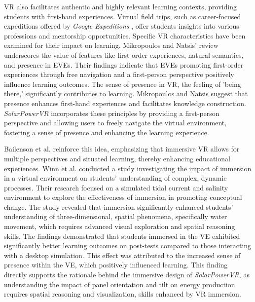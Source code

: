 \documentclass[draft, final]{vutinfth} %
\begin{document}
VR also facilitates authentic and highly relevant learning contexts, providing students with first-hand experiences. Virtual field trips, such as career-focused expeditions offered by \textit{Google Expeditions} \cite{Sung2015Effects}, offer students insights into various professions and mentorship opportunities. Specific VR characteristics have been examined for their impact on learning. Mikropoulos and Natsis' review \cite{Mikropoulos2011VrEducational} underscores the value of features like first-order experiences, natural semantics, and presence in EVEs. Their findings indicate that EVEs promoting first-order experiences through free navigation and a first-person perspective positively influence learning outcomes. The sense of presence in VR, the feeling of 'being there,' significantly contributes to learning. Mikropoulos and Natsis \cite{Mikropoulos2011VrEducational} suggest that presence enhances first-hand experiences and facilitates knowledge construction. \textit{SolarPowerVR} incorporates these principles by providing a first-person perspective and allowing users to freely navigate the virtual environment, fostering a sense of presence and enhancing the learning experience.

Bailenson et al. \cite{Bailenson2008Transformations} reinforce this idea, emphasizing that immersive VR allows for multiple perspectives and situated learning, thereby enhancing educational experiences. Winn et al. \cite{Winn2002Immersion} conducted a study investigating the impact of immersion in a virtual environment on students' understanding of complex, dynamic processes. Their research focused on a simulated tidal current and salinity environment to explore the effectiveness of immersion in promoting conceptual change. The study revealed that immersion significantly enhanced students' understanding of three-dimensional, spatial phenomena, specifically water movement, which requires advanced visual exploration and spatial reasoning skills. The findings demonstrated that students immersed in the VE exhibited significantly better learning outcomes on post-tests compared to those interacting with a desktop simulation. This effect was attributed to the increased sense of presence within the VE, which positively influenced learning. This finding directly supports the rationale behind the immersive design of \textit{SolarPowerVR}, as understanding the impact of panel orientation and tilt on energy production requires spatial reasoning and visualization, skills enhanced by VR immersion.
\end{document}
